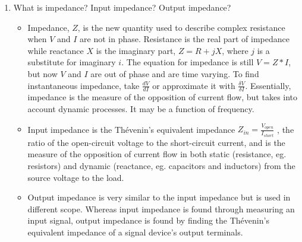 \documentclass{article}
\begin{document}
\begin{enumerate}
    \item What is impedance? Input impedance? Output impedance?
    \begin{itemize}
        \item Impedance, $Z$, is the new quantity used to describe complex resistance when $V$ and $I$ are not in phase. Resistance is the real part of impedance while reactance $X$ is the imaginary part, $Z = R + jX$, where $j$ is a substitute for imaginary $i$. The equation for impedance is still $V = Z*I$, but now $V$ and $I$ are out of phase and are time varying. To find instantaneous impedance, take $\frac{dV}{dI}$ or approximate it with $\frac{\delta V}{\delta I}$. Essentially, impedance is the measure of the opposition of current flow, but takes into account dynamic processes. It may be a function of frequency.
        \item Input impedance is the Thévenin’s equivalent impedance $Z_{in} = \frac{V_{open}}{I_{short}}$ , the ratio of the open-circuit voltage to the short-circuit current, and is the measure of the opposition of current flow in both static (resistance, eg. resistors) and dynamic (reactance, eg. capacitors and inductors) from the source voltage to the load. 
        \item Output impedance is very similar to the input impedance but is used in different scope. Whereas input impedance is found through measuring an input signal, output impedance is found by finding the Thévenin’s equivalent impedance of a signal device’s output terminals.


\end{itemize}
\end{enumerate}
\end{document}
